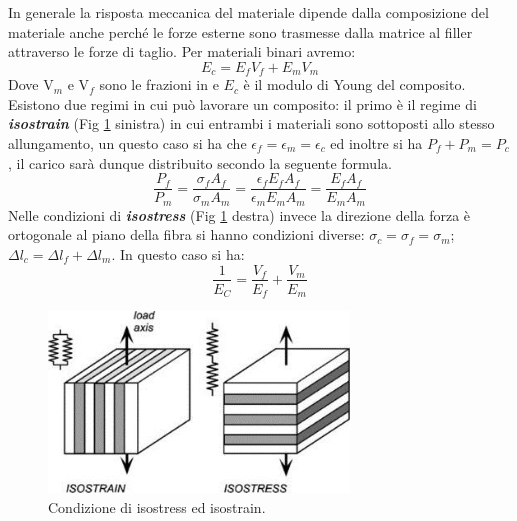 \documentclass{article}
\begin{document}
In generale la risposta meccanica del materiale dipende dalla composizione del materiale anche perché le forze esterne sono trasmesse dalla matrice al filler attraverso le forze di taglio. Per materiali binari avremo:
\begin{equation}
    E_c=E_fV_f+E_mV_m
\end{equation}
Dove V$_m$ e V$_f$ sono le frazioni in  e $E_c$ è il modulo di Young del composito.
Esistono due regimi in cui può lavorare un composito: il primo è il regime di \textbf{\textit{isostrain}} (Fig \ref{isostress-isostrain}  sinistra) in cui  entrambi i materiali sono sottoposti allo stesso allungamento, un questo caso si ha che $\epsilon_f=\epsilon_m=\epsilon_{c}$ ed inoltre si ha $P_f+P_m=P_c$, il carico sarà dunque distribuito secondo la seguente formula.
\begin{equation}
    \frac{P_f}{P_m}=\frac{\sigma_fA_f}{\sigma_mA_m}=\frac{\epsilon_fE_fA_f}{\epsilon_mE_mA_m}=\frac{E_fA_f}{E_mA_m}
\end{equation}
Nelle condizioni di \textbf{\textit{isostress}} (Fig \ref{isostress-isostrain} destra) invece la direzione della forza è ortogonale al piano della fibra si hanno condizioni diverse: $\sigma_c=\sigma_f=\sigma_m$; $\Delta l_c=\Delta l_f+\Delta l_m$. In questo caso si ha:
\begin{equation}
    \frac{1}{E_C}=\frac{V_f}{E_f}+\frac{V_m}{E_m}
\end{equation}
\begin{figure}[h]
    \centering
    \includegraphics[width=8cm]{isostress-isostrain.png}
    \caption{Condizione di isostress ed isostrain.}
    \label{isostress-isostrain}
\end{figure}
\end{document}
